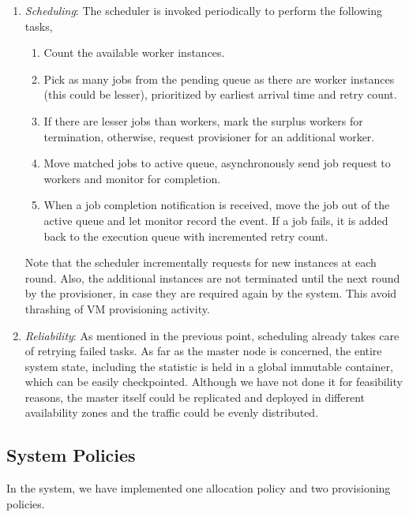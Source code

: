 \documentclass[a4paper]{IEEEtran}
\begin{document}
\begin{enumerate}
  \item \emph{Scheduling}: \label{scheduling} The scheduler is invoked periodically to perform the following tasks,
  \begin{enumerate}
    \item Count the available worker instances.
    \item Pick as many jobs from the pending queue as there are worker instances (this could be lesser), 
    prioritized by earliest arrival time and retry count.
    \item If there are lesser jobs than workers, mark the surplus workers for termination, otherwise, request
    provisioner for an additional worker.
    \item Move matched jobs to active queue, asynchronously send job request to workers and monitor for completion.
    \item When a job completion notification is received, move the job out of the active queue and let monitor record the event. If a job fails, it is added back to the execution queue with incremented retry count.
  \end{enumerate}

  Note that the scheduler incrementally requests for new instances at each round. Also,
  the additional instances are not terminated until the next round by the provisioner, in case they are required again by the system. This avoid thrashing of VM provisioning activity.

  \item \emph{Reliability}: As mentioned in the previous point, scheduling already takes care of 
  retrying failed tasks. As far as the master node is concerned, the entire system state, including
  the statistic is held in a global immutable container, which can be easily checkpointed. Although
  we have not done it for feasibility reasons, the master itself could be replicated and deployed
  in different availability zones and the traffic could be evenly distributed.
\end{enumerate}

\subsection{System Policies}

In the system, we have implemented one allocation policy and two provisioning policies.
\end{document}
